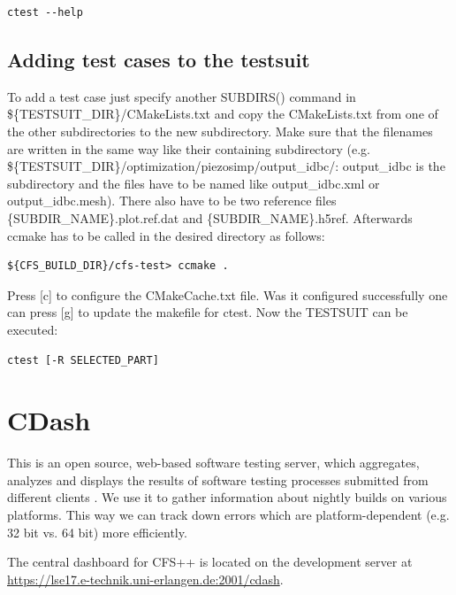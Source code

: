 \begin{verbatim}
ctest --help
\end{verbatim}

\subsection{Adding test cases to the testsuit}

To   add   a  test   case   just   specify   another  SUBDIRS()   command   in
\$\{TESTSUIT\_DIR\}/CMakeLists.txt and copy the CMakeLists.txt from one of the
other subdirectories to the new subdirectory. Make sure that the filenames are
written   in  the   same  way   like  their   containing   subdirectory  (e.g.
\$\{TESTSUIT\_DIR\}/optimization/piezosimp/output\_idbc/:  output\_idbc is the
subdirectory  and  the  files  have  to  be  named  like  output\_idbc.xml  or
output\_idbc.mesh).    There   also   have   to   be   two   reference   files
\{SUBDIR\_NAME\}.plot.ref.dat  and  \{SUBDIR\_NAME\}.h5ref. Afterwards  ccmake
has to be called in the desired directory as follows:

\begin{verbatim}
${CFS_BUILD_DIR}/cfs-test> ccmake .
\end{verbatim}

Press [c] to configure the CMakeCache.txt file. Was it configured successfully
one can press  [g] to update the  makefile for ctest. Now the  TESTSUIT can be
executed:

\begin{verbatim}
ctest [-R SELECTED_PART]
\end{verbatim}


\section{CDash}
\label{sec:cdash}

This is an  open source, web-based software testing  server, which aggregates,
analyzes and displays the results of software testing processes submitted from
different clients \cite{cdash}.  We use it to gather information about nightly
builds  on various  platforms. This  way we  can track  down errors  which are
platform-dependent (e.g. 32 bit vs.  64 bit) more efficiently.

The  central dashboard  for  CFS++ is  located  on the  development server  at
\url{https://lse17.e-technik.uni-erlangen.de:2001/cdash}.



